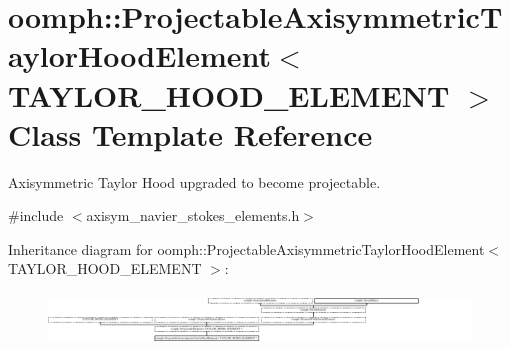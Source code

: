 \hypertarget{classoomph_1_1ProjectableAxisymmetricTaylorHoodElement}{}\section{oomph\+:\+:Projectable\+Axisymmetric\+Taylor\+Hood\+Element$<$ T\+A\+Y\+L\+O\+R\+\_\+\+H\+O\+O\+D\+\_\+\+E\+L\+E\+M\+E\+NT $>$ Class Template Reference}
\label{classoomph_1_1ProjectableAxisymmetricTaylorHoodElement}


Axisymmetric Taylor Hood upgraded to become projectable.  




{\ttfamily \#include $<$axisym\+\_\+navier\+\_\+stokes\+\_\+elements.\+h$>$}

Inheritance diagram for oomph\+:\+:Projectable\+Axisymmetric\+Taylor\+Hood\+Element$<$ T\+A\+Y\+L\+O\+R\+\_\+\+H\+O\+O\+D\+\_\+\+E\+L\+E\+M\+E\+NT $>$\+:\begin{figure}[H]
\begin{center}
\leavevmode
\includegraphics[height=1.414141cm]{classoomph_1_1ProjectableAxisymmetricTaylorHoodElement}
\end{center}
\end{figure}
